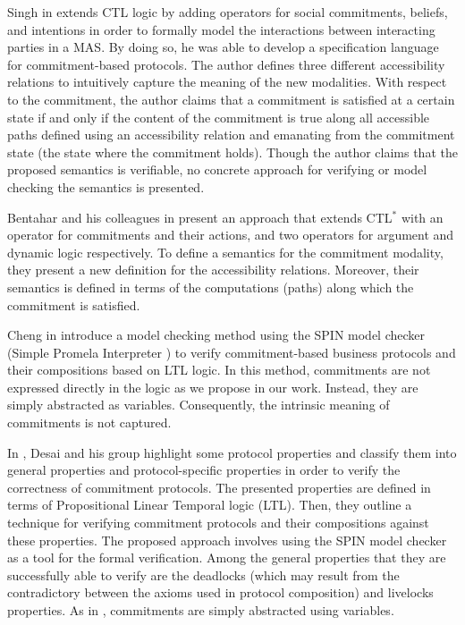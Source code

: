Singh in \cite{Singh2000} extends CTL logic by adding operators for
social commitments, beliefs, and intentions in order to formally
model the interactions between interacting parties in a MAS. By
doing so, he was able to develop a specification language for
commitment-based protocols. The author defines three different
accessibility relations to intuitively capture the meaning of the
new modalities. With respect to the commitment, the author claims
that a commitment is satisfied at a certain state if and only if
the content of the commitment is true along all accessible paths
defined using an accessibility relation and emanating from the
commitment state (the state where the commitment holds). Though
the author claims that the proposed semantics is verifiable, no
concrete approach for verifying or model checking the semantics is
presented.

Bentahar and his colleagues in \cite{Bentahar2004,Bentahar2007}
present an approach that extends CTL$^*$ with an operator for
commitments and their actions, and two operators for argument and
dynamic logic respectively. To define a semantics for the
commitment modality, they present a new definition for the
accessibility relations. Moreover, their semantics is defined in
terms of the computations (paths) along which the commitment is
satisfied.

Cheng in \cite{Cheng2006} introduce a model checking method using
the SPIN model checker (Simple Promela Interpreter
\cite{Holzmann1997}) to verify commitment-based business
protocols and their compositions based on LTL logic. In this
method, commitments are not expressed directly in the logic as we
propose in our work. Instead, they are simply abstracted as
variables. Consequently, the intrinsic meaning of commitments is
not captured.

In \cite{Desai2007}, Desai and his group highlight some protocol
properties and classify them into general properties and
protocol-specific properties in order to verify the correctness of
commitment protocols. The presented properties are defined in
terms of Propositional Linear Temporal logic (LTL). Then, they
outline a technique for verifying commitment protocols and their
compositions against these properties. The proposed approach
involves using the SPIN model checker as a tool for the formal
verification. Among the general properties that they are
successfully able to verify are the deadlocks (which may result
from the contradictory between the axioms used in protocol
composition) and livelocks properties. As in \cite{Cheng2006},
commitments are simply abstracted using variables.

